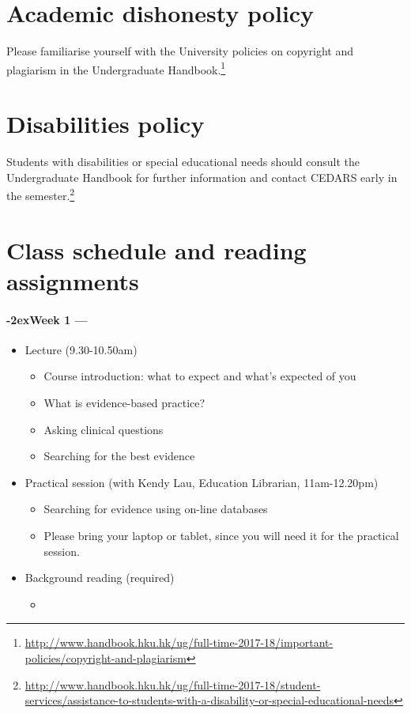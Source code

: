 \documentclass[a4paper, 11pt]{article}
\newcommand{\week}[1]{%
  \paragraph*{\kern-2ex\quad #1 --- \syldate{\today}}%


  \ifdim\wd1=\wd\MONDAY
    \AdvanceDate[7]
  \else
    \AdvanceDate[7]
  \fi
}
\begin{document}
\section*{Academic dishonesty policy}

Please familiarise yourself with the University policies on copyright and plagiarism in the Undergraduate Handbook.\footnote{\url{http://www.handbook.hku.hk/ug/full-time-2017-18/important-policies/copyright-and-plagiarism}}

\section*{Disabilities policy}

Students with disabilities or special educational needs should consult the Undergraduate Handbook for further information and contact CEDARS early in the semester.\footnote{\url{http://www.handbook.hku.hk/ug/full-time-2017-18/student-services/assistance-to-students-with-a-disability-or-special-educational-needs}}



\section*{Class schedule and reading assignments} 

\SetDate[09/01/2019] %
\week{Week 1} 
\begin{itemize}
\item Lecture (9.30-10.50am)
	\begin{itemize}
	\item Course introduction: what to expect and what's expected of you
	\item What is evidence-based practice?
	\item Asking clinical questions
	\item Searching for the best evidence
	\end{itemize}
\item Practical session (with Kendy Lau, Education Librarian, 11am-12.20pm)
	\begin{itemize}
	\item Searching for evidence using on-line databases
	\item Please bring your laptop or tablet, since you will need it for the practical session.
	\end{itemize}
\item Background reading (required)
	\begin{itemize}
	\item \citet[chapters 1--3]{Dollaghan2007a}
	\end{itemize}
\end{itemize}
\end{document}
